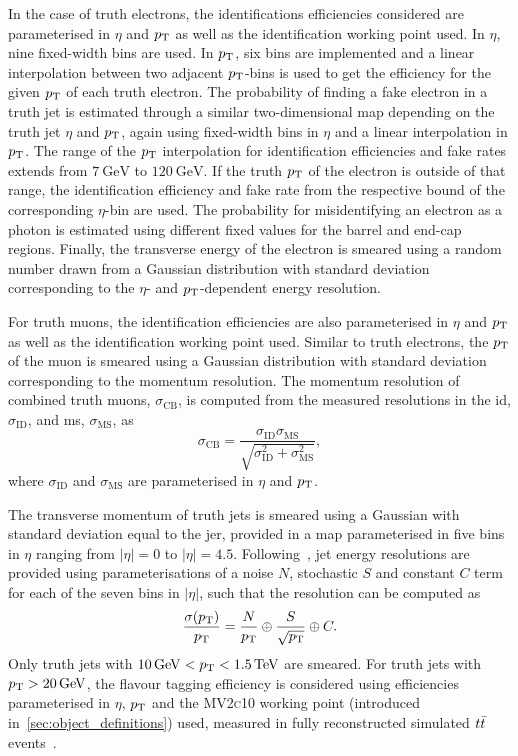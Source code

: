 In the case of truth electrons, the identifications efficiencies considered are parameterised in $\eta$ and $p_{\textrm{T}}$ as well as the identification working point used. In $\eta$, nine fixed-width bins are used. In $p_{\textrm{T}}$, six bins are implemented and a linear interpolation between two adjacent $p_{\textrm{T}}$-bins is used to get the efficiency for the given $p_{\textrm{T}}$ of each truth electron. The probability of finding a fake electron in a truth jet is estimated through a similar two-dimensional map depending on the truth jet $\eta$ and $p_{\textrm{T}}$, again using fixed-width bins in $\eta$ and a linear interpolation in $p_{\textrm{T}}$. The range of the $p_{\textrm{T}}$ interpolation for identification efficiencies and fake rates extends from $\SI{7}{\GeV}$ to $\SI{120}{\GeV}$. If the truth $p_{\textrm{T}}$ of the electron is outside of that range, the identification efficiency and fake rate from the respective bound of the corresponding $\eta$-bin are used. The probability for misidentifying an electron as a photon is estimated using different fixed values for the barrel and end-cap regions. Finally, the transverse energy of the electron is smeared using a random number drawn from a Gaussian distribution with  standard deviation corresponding to the $\eta$- and $p_{\textrm{T}}$-dependent energy resolution.  

For truth muons, the identification efficiencies are also parameterised in $\eta$ and $p_{\textrm{T}}$ as well as the identification working point used. Similar to truth electrons, the  $p_{\textrm{T}}$ of the muon is smeared using a Gaussian distribution with standard deviation corresponding to the momentum resolution. The momentum resolution of combined truth muons, $\sigma_\mathrm{CB}$, is computed from the measured resolutions in the \gls{id},$\sigma_\mathrm{ID}$, and \gls{ms}, $\sigma_\mathrm{MS}$, as
\begin{equation}
	\sigma_\mathrm{CB} = \frac{\sigma_\mathrm{ID}\sigma_\mathrm{MS}}{\sqrt{\sigma_\mathrm{ID}^2 + \sigma_\mathrm{MS}^2}},
\end{equation}
where $\sigma_\mathrm{ID}$ and $\sigma_\mathrm{MS}$ are parameterised in $\eta$ and $p_{\textrm{T}}$.

The transverse momentum of truth jets is smeared using a Gaussian with standard deviation equal to the \gls{jer}, provided in a map parameterised in five bins in $\eta$ ranging from $\vert\eta\vert = 0$ to $\vert\eta\vert = 4.5$. Following~\cite{Aad:2020flx}, jet energy resolutions are provided using parameterisations of a noise $N$, stochastic $S$ and constant $C$ term for each of the seven bins in $\vert\eta\vert$, such that the resolution can be computed as
\begin{equation}
	\frac{\sigma(p_{\textrm{T}})}{p_{\textrm{T}}} = \frac{N}{p_{\textrm{T}}}\oplus\frac{S}{\sqrt{p_{\textrm{T}}}}\oplus C.
\end{equation}
Only truth jets with $\SI{10}{\GeV} < \pt < \SI{1.5}{\TeV}$ are smeared. For truth jets with $\pt > \SI{20}{\GeV}$, the flavour tagging efficiency is considered using efficiencies parameterised in $\eta$, $p_{\textrm{T}}$ and the \textsc{MV2c10} working point (introduced in~\cref{sec:object_definitions}) used, measured in fully reconstructed simulated $t\bar{t}$ events~\cite{FTAG-2018-01}.

